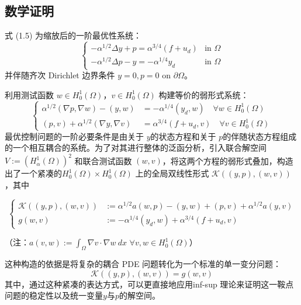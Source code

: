 \documentclass[UTF8, 12pt]{ctexart}
\begin{document}
\subsection{数学证明}
\label{subsec:math-defs}

式 (1.5) 为缩放后的一阶最优性系统：
\begin{equation}
\begin{cases}
-\alpha^{1/2}\Delta y + p = \alpha^{3/4}(f+u_d) & \text{in } \Omega \\
-\alpha^{1/2}\Delta p - y = -\alpha^{1/4}y_d & \text{in } \Omega
\end{cases}
\end{equation}
并伴随齐次 Dirichlet 边界条件 $y=0, p=0$ on $\partial\Omega$。

利用测试函数 $w \in H_0^1(\Omega)$，$v \in H_0^1(\Omega)$ 构建等价的弱形式系统：
\begin{equation}
\begin{cases}
\alpha^{1/2}(\nabla p, \nabla w) - (y, w) &= -\alpha^{1/4}(y_d, w) \quad \forall w \in H_0^1(\Omega) \\
(p, v) + \alpha^{1/2}(\nabla y, \nabla v) &= \alpha^{3/4}(f+u_d, v) \quad \forall v \in H_0^1(\Omega)
\end{cases}
\end{equation}
最优控制问题的一阶必要条件是由关于 $y$的状态方程和关于 $p$的伴随状态方程组成的一个相互耦合的系统。为了对其进行整体的泛函分析，引入联合解空间 $V := (H_\alpha^1(\Omega))^2$ 和联合测试函数 $(w, v)$，将这两个方程的弱形式叠加，构造出了一个紧凑的$H_{0}^{1}(\Omega)\times H_{0}^{1}(\Omega)$ 上的全局双线性形式 $\mathcal{K}((y, p), (w, v))$，其中

\begin{equation}
    \begin{cases}
        \mathcal{K}((y,p),(w,v))&:=\alpha^{1/2}a(w,p)-(y,w)+(p,v)+\alpha^{1/2}a(y,v)\\
        g(w,v)&:=-\alpha^{1/4}(y_{d},w)+\alpha^{3/4}(f+u_{d},v)
    \end{cases}
\end{equation}

（注：$a(v,w):=\int_{\Omega}\nabla v\cdot\nabla w~dx$  $\forall v,w\in H_{0}^{1}(\Omega)$）



这种构造的依据是将复杂的耦合 PDE 问题转化为一个标准的单一变分问题：
\begin{equation}
    \mathcal{K}((y, p), (w, v)) = g(w, v)
\end{equation}
其中，通过这种紧凑的表达方式，可以更直接地应用inf-sup 理论来证明这一鞍点问题的稳定性以及统一变量$y$与$p$的解空间。
\end{document}
